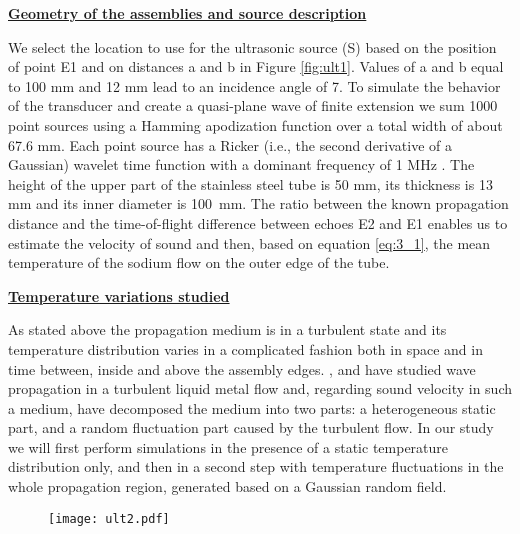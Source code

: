         \underline{\textbf{Geometry of the assemblies and source description}}

            We select the location to use for the ultrasonic source (S) based on the position of point E1 and on distances a and b in Figure \ref{fig:ult1}.
Values of a and b equal to 100 mm and 12 mm lead to an incidence angle of 7\textdegree{}. To simulate the behavior of the transducer and create a quasi-plane
wave of finite extension we sum 1000 point sources using a Hamming apodization function over a total width of about 67.6 mm. Each point source has a Ricker
(i.e., the second derivative of a Gaussian) wavelet time function with a dominant frequency of 1 MHz \parencite{Cristini2012Someillustrativeexamples}. The
height of the upper part of the stainless steel tube is 50 mm, its thickness is 13 mm and its inner diameter is 100~mm.
            The ratio between the known propagation distance and the time-of-flight difference between echoes E2 and E1 enables us to estimate the velocity of
sound and then, based on equation \ref{eq:3_1}, the mean temperature of the sodium flow on the outer edge of the tube.

        \underline{\textbf{Temperature variations studied}}

            As stated above the propagation medium is in a turbulent state and its temperature distribution varies in a complicated fashion both in space and
in time between, inside and above the assembly edges. \textcite{Buffet1984Studyoftemperature}, \textcite{Fiorina1998Applicationofthe} and
\textcite{Lue2012Stochasticsimulationof} have studied wave propagation in a turbulent liquid metal flow and, regarding sound velocity in such a medium, have
decomposed the medium into two parts: a heterogeneous static part, and a random fluctuation part caused by the turbulent flow.
            In our study we will first perform simulations in the presence of a static temperature distribution only, and then in a second step with
temperature fluctuations in the whole propagation region, generated based on a Gaussian random field.
            \begin{figure}[htbp]
                    \centerline{\texttt{[image: ult2.pdf]}}
                \label{fig:ult2}
            \end{figure}

